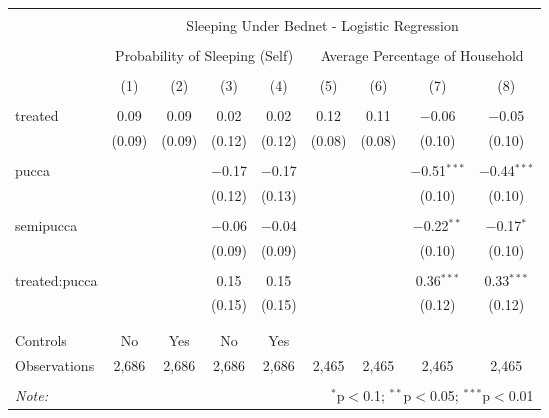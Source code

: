 
\begin{table}[!htbp] \centering 
  \caption{} 
  \label{} 
\small 
\begin{tabular}{@{\extracolsep{5pt}}lcccccccc} 
\\[-1.8ex]\hline 
\hline \\[-1.8ex] 
 & \multicolumn{8}{c}{Sleeping Under Bednet - Logistic Regression} \\ 
\cline{2-9} 
\\[-1.8ex] & \multicolumn{4}{c}{Probability of Sleeping (Self)} & \multicolumn{4}{c}{Average Percentage of Household} \\ 
\\[-1.8ex] & (1) & (2) & (3) & (4) & (5) & (6) & (7) & (8)\\ 
\hline \\[-1.8ex] 
 treated & 0.09 & 0.09 & 0.02 & 0.02 & 0.12 & 0.11 & $-$0.06 & $-$0.05 \\ 
  & (0.09) & (0.09) & (0.12) & (0.12) & (0.08) & (0.08) & (0.10) & (0.10) \\ 
  & & & & & & & & \\ 
 pucca &  &  & $-$0.17 & $-$0.17 &  &  & $-$0.51$^{***}$ & $-$0.44$^{***}$ \\ 
  &  &  & (0.12) & (0.13) &  &  & (0.10) & (0.10) \\ 
  & & & & & & & & \\ 
 semipucca &  &  & $-$0.06 & $-$0.04 &  &  & $-$0.22$^{**}$ & $-$0.17$^{*}$ \\ 
  &  &  & (0.09) & (0.09) &  &  & (0.10) & (0.10) \\ 
  & & & & & & & & \\ 
 treated:pucca &  &  & 0.15 & 0.15 &  &  & 0.36$^{***}$ & 0.33$^{***}$ \\ 
  &  &  & (0.15) & (0.15) &  &  & (0.12) & (0.12) \\ 
  & & & & & & & & \\ 
\hline \\[-1.8ex] 
Controls & No & Yes & No & Yes &  &  &  &  \\ 
Observations & 2,686 & 2,686 & 2,686 & 2,686 & 2,465 & 2,465 & 2,465 & 2,465 \\ 
\hline 
\hline \\[-1.8ex] 
\textit{Note:}  & \multicolumn{8}{r}{$^{*}$p$<$0.1; $^{**}$p$<$0.05; $^{***}$p$<$0.01} \\ 
\end{tabular} 
\end{table} 
